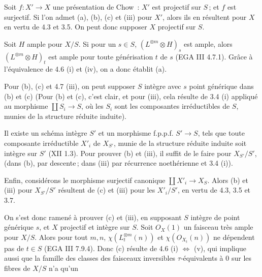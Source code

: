 
Soit \(f:X'\to X\) une pr\'esentation de Chow~: \(X'\) est projectif sur \(S\)\,; et \(f\) est surjectif. Si l'on admet (a), (b), (c) et (iii) pour \(X'\), alors ils en r\'esultent pour \(X\) en vertu de 4.3 et 3.5. On peut donc supposer \(X\) projectif sur \(S\).

Soit \(H\) ample pour \(X/S\). Si pour un \(s\in S\), \((L^{\otimes m}\otimes H)_s\) est ample, alors \((L^{\otimes m}\otimes H)_t\) est ample pour toute g\'en\'erisation \(t\) de \(s\) (EGA III 4.7.1). Gr\^ace \`a l'\'equivalence de 4.6 (i) et (iv), on a donc \'etablit (a).

Pour (b), (c) et 4.7 (iii), on peut supposer \(S\) int\`egre avec \(s\) point g\'en\'erique dans (b) et (c) (Pour (b) et (c), c'est clair, et pour (iii), cela r\'esulte de 3.4 (i) appliqu\'e au morphisme \(\coprod S_i\to S\), o\`u les \(S_i\) sont les composantes irr\'eductibles de \(S\), munies de la structure r\'eduite induite).

Il existe un sch\'ema int\`egre \(S'\) et un morphisme f.p.p.f. \(S'\to S\), tels que toute composante irr\'eductible \(X'_i\) de \(X_{S'}\), munie de la structure r\'eduite induite soit int\`egre sur \(S'\) (XII 1.3). Pour prouver (b) et (iii), il suffit de le faire pour \(X_{S'}/S'\), (dans (b), par descente\,; dans (iii) par r\'ecurrence noeth\'erienne et 3.4 (i)).

Enfin, consid\'erons le morphisme surjectif canonique \(\coprod X'_i\to X_S\). Alors (b) et (iii) pour \(X_{S'}/S'\) r\'esultent de (c) et (iii) pour les \(X'_i/S'\), en vertu de 4.3, 3.5 et 3.7.

On s'est donc ramen\'e \`a prouver (c) et (iii), en supposant \(S\) int\`egre de point g\'en\'erique \(s\), et \(X\) projectif et int\`egre sur \(S\). Soit \({O}_X(1)\) un faisceau tr\`es ample pour \(X/S\). Alors pour tout \(m,n\), \(\chi(L_t^{\otimes m}(n))\) et \(\chi({O}_{X_t}(n))\) ne d\'ependent pas de \(t\in S\) (EGA III 7.9.4). Donc (c) r\'esulte de 4.6 (i) \(\Longleftrightarrow\) (v), qui implique aussi que la famille des classes des faisceaux inversibles \(\tau\)-\'equivalents \`a \(0\) sur les fibres de \(X/S\) n'a qu'un
